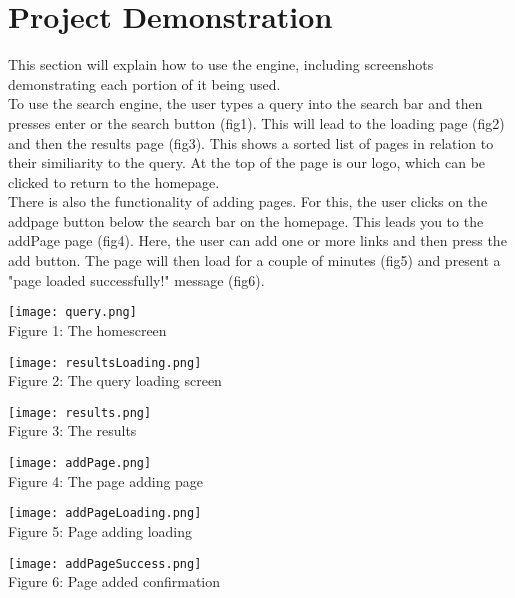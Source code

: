 \section{Project Demonstration}
This section will explain how to use the engine, including screenshots demonstrating each portion of it being used. \\
To use the search engine, the user types a query into the search bar and then presses enter or the search button (fig1). This will lead to the loading page (fig2) and then the results page (fig3). This shows a sorted list of pages in relation to their similiarity to the query. At the top of the page is our logo, which can be clicked to return to the homepage.\\
There is also the functionality of adding pages. For this, the user clicks on the addpage button below the search bar on the homepage. This leads you to the addPage page (fig4). Here, the user can add one or more links and then press the add button. The page will then load for a couple of minutes (fig5) and present a "page loaded successfully!" message (fig6). 

\texttt{[image: query.png]}\\
Figure 1: The homescreen

\texttt{[image: resultsLoading.png]}\\
Figure 2: The query loading screen

\texttt{[image: results.png]}\\
Figure 3: The results

\texttt{[image: addPage.png]}\\
Figure 4: The page adding page

\texttt{[image: addPageLoading.png]}\\
Figure 5: Page adding loading

\texttt{[image: addPageSuccess.png]}\\
Figure 6: Page added confirmation

